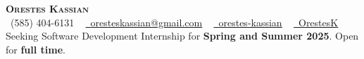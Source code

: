 \documentclass[letterpaper,11pt]{article}
\begin{document}
\begin{center}
    \textbf{\fontsize{22}{22} \scshape Orestes Kassian} \\ \vspace{4pt}
    \small 
    \faPhone\ (585) 404-6131 ~
    \href{mailto:oresteskassian@gmail.com}{\faEnvelope\ \uline{oresteskassian@gmail.com}} ~
    \href{https://linkedin.com/in/orestes-kassian}{\faLinkedin\ \uline{orestes-kassian}} ~
    \href{https://github.com/OrestesK}{\faGithub\ \uline{OrestesK}} \\ 
    \vspace{6pt}
    Seeking Software Development Internship for \textbf{Spring and Summer 2025}. Open for \textbf{full time}.
\end{center}
\vspace{-20pt}

\end{document}
